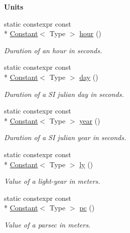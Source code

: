\begin{Indent}{\bf Units}
\begin{DoxyCompactItemize}
static constexpr const \\*
\hyperlink{exceptionmagrathea_1_1Constant}{Constant}$<$ Type $>$ \hyperlink{exceptionmagrathea_1_1Constants_afcfc2afca02f8f5d87f0d7304075e56a}{hour} ()
\begin{DoxyCompactList}\small\item\em Duration of an hour in seconds. \end{DoxyCompactList}\item 
static constexpr const \\*
\hyperlink{exceptionmagrathea_1_1Constant}{Constant}$<$ Type $>$ \hyperlink{exceptionmagrathea_1_1Constants_adcb0ad58dd5a1d334f6c42fbfcde3e50}{day} ()
\begin{DoxyCompactList}\small\item\em Duration of a S\-I julian day in seconds. \end{DoxyCompactList}\item 
static constexpr const \\*
\hyperlink{exceptionmagrathea_1_1Constant}{Constant}$<$ Type $>$ \hyperlink{exceptionmagrathea_1_1Constants_a7a71c49fbc4b1a23bbe0eb05f2f7ef65}{year} ()
\begin{DoxyCompactList}\small\item\em Duration of a S\-I julian year in seconds. \end{DoxyCompactList}\item 
static constexpr const \\*
\hyperlink{exceptionmagrathea_1_1Constant}{Constant}$<$ Type $>$ \hyperlink{exceptionmagrathea_1_1Constants_ad85451ee35f3d385335c1fd8ddb7ee43}{ly} ()
\begin{DoxyCompactList}\small\item\em Value of a light-\/year in meters. \end{DoxyCompactList}\item 
static constexpr const \\*
\hyperlink{exceptionmagrathea_1_1Constant}{Constant}$<$ Type $>$ \hyperlink{exceptionmagrathea_1_1Constants_a3c9f71f482dbe3251819b48d51f5caf1}{pc} ()
\begin{DoxyCompactList}\small\item\em Value of a parsec in meters. \end{DoxyCompactList}\end{DoxyCompactItemize}
\end{Indent}
